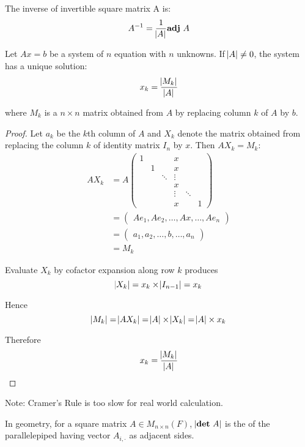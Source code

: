 \begin{theorem}
    The inverse of invertible square matrix A is:
    \begin{equation*}
        A^{-1} = \frac{1}{\abs{A}} \displaystyle \mathbf{adj} ~\displaystyle A
    \end{equation*}
\end{theorem}


\begin{theorem}
	Let $Ax=b$ be a system of $n$ equation with $n$ unknowns. If $\abs{A} \neq 0$, the system has a unique solution:
	\begin{equation}
		x_k = \frac{\abs{M_k}}{\abs{A}}
	\end{equation}
	
	where $M_k$ is a $n\times n$ matrix obtained from $A$ by replacing column $k$ of $A$ by $b$.
\end{theorem}

\begin{proof}
	Let $a_k$ be the $k$th column of $A$ and $X_k$ denote the matrix obtained from replacing the column $k$ of identity matrix $I_n$ by $x$. Then $A X_k = M_k$:
	\begin{equation*}
	\begin{aligned}
        A X_k &= A \begin{pmatrix}
			1 &   &   & x &   \\
			 & 1 &  & x &   \\
			 && \ddots &  \vdots \\
			&&& x & \\
			&&& \vdots & \ddots \\
			&&& x&   & 1 
		\end{pmatrix} \\
		&= \begin{pmatrix}
		    Ae_1, Ae_2, \dots, Ax, \dots, Ae_n
		\end{pmatrix} \\
		& = \begin{pmatrix}
		    a_1, a_2, \dots, b, \dots, a_n
		\end{pmatrix} \\
		&= M_k
		\end{aligned}
    \end{equation*}
	
	
	Evaluate $X_k$ by cofactor expansion along row $k$ produces
	\begin{equation*}
		\abs{X_k} = x_k \times \abs{I_{n-1}} = x_k
	\end{equation*}
	
	Hence 
	\begin{equation*}
		\abs{M_k} = \abs{A X_k} = \abs{A} \times \abs{X_k} = \abs{A} \times x_k
	\end{equation*}
	
	Therefore
	\begin{equation*}
		x_k = \frac{\abs{M_k}}{\abs{A}}
	\end{equation*}
\end{proof}

Note: Cramer's Rule is too slow for real world calculation.

\begin{theorem}
	In geometry, for a square matrix $A \in M_{n\times n}(F)$, $\abs{\displaystyle \mathbf{det} ~\displaystyle A}$ is the  of the parallelepiped having vector $A_{i,\cdot}$ as adjacent sides.
\end{theorem}


